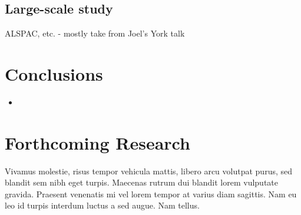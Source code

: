 \documentclass[a0,portrait]{a0poster}
\begin{document}
\begin{multicols}{2}
\subsection{Large-scale study}

ALSPAC, etc. - mostly take from Joel's York talk


\color{SaddleBrown} %

\section*{Conclusions}

\begin{itemize}
\item 
\end{itemize}

\color{DarkSlateGray} %


\section*{Forthcoming Research}

Vivamus molestie, risus tempor vehicula mattis, libero arcu volutpat purus, sed blandit sem nibh eget turpis. Maecenas rutrum dui blandit lorem vulputate gravida. Praesent venenatis mi vel lorem tempor at varius diam sagittis. Nam eu leo id turpis interdum luctus a sed augue. Nam tellus.





\end{multicols}
\end{document}
